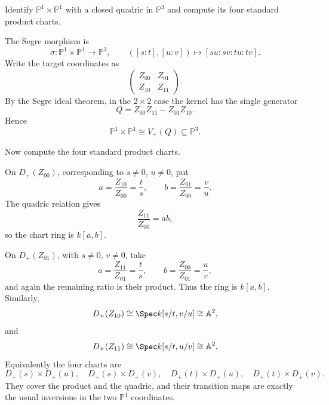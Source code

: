 \begin{problem}\label{prob:vi38-10}
Identify \(\mathbb P^1\times\mathbb P^1\) with a closed quadric in \(\mathbb P^3\) and compute its four standard product charts.
\end{problem}

\ifdefined\FullProblemDossiers
\begin{solution}
The Segre morphism is
\[
\sigma:\mathbb P^1\times\mathbb P^1\longrightarrow\mathbb P^3,
\qquad
([s:t],[u:v])\longmapsto[su:sv:tu:tv].
\]
Write the target coordinates as
\[
\begin{pmatrix}
Z_{00}&Z_{01}\\
Z_{10}&Z_{11}
\end{pmatrix}.
\]
By the Segre ideal theorem, in the \(2\times2\) case the kernel has the single
generator
\[
Q=Z_{00}Z_{11}-Z_{01}Z_{10}.
\]
Hence
\[
\boxed{\mathbb P^1\times\mathbb P^1
\cong V_+(Q)\subseteq\mathbb P^3}.
\]

Now compute the four standard product charts.

On \(D_+(Z_{00})\), corresponding to \(s\neq0\), \(u\neq0\), put
\[
a=\frac{Z_{10}}{Z_{00}}=\frac ts,
\qquad
b=\frac{Z_{01}}{Z_{00}}=\frac vu.
\]
The quadric relation gives
\[
\frac{Z_{11}}{Z_{00}}=ab,
\]
so the chart ring is \(k[a,b]\).

On \(D_+(Z_{01})\), with \(s\neq0\), \(v\neq0\), take
\[
a=\frac{Z_{11}}{Z_{01}}=\frac ts,
\qquad
b=\frac{Z_{00}}{Z_{01}}=\frac uv,
\]
and again the remaining ratio is their product. Thus the ring is \(k[a,b]\).
Similarly,
\[
D_+(Z_{10})\cong\Spec k[s/t,v/u]\cong\mathbb A^2,
\]
and
\[
D_+(Z_{11})\cong\Spec k[s/t,u/v]\cong\mathbb A^2.
\]
Equivalently the four charts are
\[
D_+(s)\times D_+(u),\quad
D_+(s)\times D_+(v),\quad
D_+(t)\times D_+(u),\quad
D_+(t)\times D_+(v).
\]
They cover the product and the quadric, and their transition maps are exactly the
usual inversions in the two \(\mathbb P^1\) coordinates.
\end{solution}
\fi
